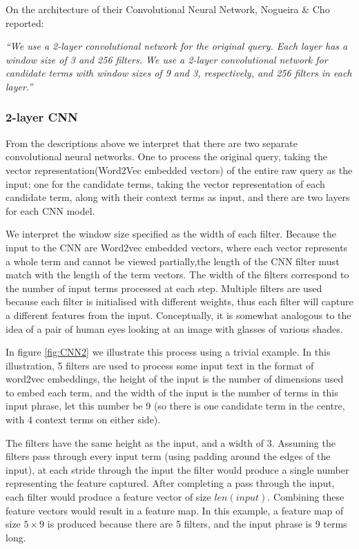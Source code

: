 On the architecture of their Convolutional Neural Network, Nogueira \& Cho \cite{nogueira2017task} reported:

\textit{``We use a 2-layer convolutional network
for the original query. Each layer has a window
size of 3 and 256 filters. We use a 2-layer convolutional
network for candidate terms with window
sizes of 9 and 3, respectively, and 256 filters
in each layer.''}

\subsubsection{2-layer CNN}

From the descriptions above we interpret that there are two separate convolutional neural networks. One to process the original query, taking the vector representation(Word2Vec embedded vectors) of the entire raw query as the input; one for the candidate terms, taking the vector representation of each candidate term, along with their context terms as input, and there are two layers for each CNN model.

We interpret the window size specified as the width of each filter. Because the input to the CNN are Word2vec embedded vectors,  where each vector represents a whole term and cannot be viewed partially,the length of the CNN filter must match with the length of the term vectors. The width of the filters correspond to the number of input terms processed at each step.  Multiple filters are used because each filter is initialised with different weights, thus each filter will capture a different features from the input. Conceptually, it is somewhat analogous to the idea of a pair of human eyes looking at an image with glasses of various shades.  

In figure \ref{fig:CNN2} we illustrate this process using a trivial example.  In this illustration, 5 filters are used to process some input text in the format of word2vec embeddings, the height of the input is the number of dimensions used to embed each term, and the width of the input is the number of terms in this input phrase, let this number be 9 (so there is one candidate term in the centre, with 4 context terms on either side). 

The filters have the same height as the input, and a width of 3. Assuming the filters pass through every input term (using padding around the edges of the input), at each stride through the input the filter would produce a single number representing the feature captured. After completing a pass through the input, each filter would produce a feature vector of size $len(input)$. Combining these feature vectors would result in a feature map. In this example, a feature map of size $5 \times 9$ is produced because there are 5 filters, and the input phrase is 9 terms long.




